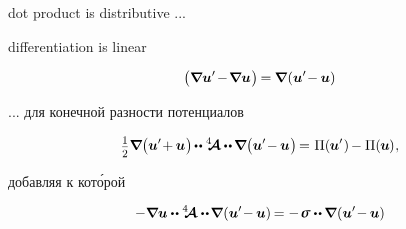 \noindent
dot product is distributive ...

\noindent
differentiation is linear

\[
\bigl( \boldnabla \bm{u}' \hspace{-0.3ex} - \hspace{-0.32ex} \boldnabla \bm{u} \hspace{.1ex} \bigr) \hspace{-0.2ex}
= \hspace{-0.1ex} \boldnabla \hspace{.1ex} ( \bm{u}' \hspace{-0.4ex} - \hspace{-0.1ex} \bm{u} )
\]

\noindent
... \foreignlanguage{russian}{для конечной разности потенциалов}

\[
\smalldisplaystyleonehalf \boldnabla \bigl(
\bm{u}' \hspace{-0.4ex} + \hspace{-0.1ex} \bm{u}
\hspace{.1ex} \bigr) \hspace{-0.2ex}
\dotdotp \stiffnesstensor \hspace{-0.1ex} \dotdotp \hspace{-0.15ex} \boldnabla \bigl(
\bm{u}' \hspace{-0.4ex} - \hspace{-0.1ex} \bm{u}
\hspace{.1ex} \bigr) \hspace{-0.25ex}
= \hspace{.1ex} \potential(\hspace{-0.1ex}\bm{u}'\hspace{.1ex}) \hspace{-0.2ex}
- \potential(\hspace{-0.1ex}\bm{u}\hspace{-0.1ex})
\hspace{.1ex} ,
\]

\noindent
\foreignlanguage{russian}{добавляя к кот\'{о}рой}

\[
- \boldnabla \bm{u} \dotdotp \stiffnesstensor \dotdotp \hspace{-0.25ex} \boldnabla \hspace{.1ex} ( \bm{u}' \hspace{-0.4ex} - \hspace{-0.1ex} \bm{u} ) \hspace{-0.2ex}
= - \hspace{.2ex} \linearstress \dotdotp \hspace{-0.1ex} \boldnabla \hspace{.1ex} ( \bm{u}' \hspace{-0.4ex} - \hspace{-0.1ex} \bm{u} )
\]

